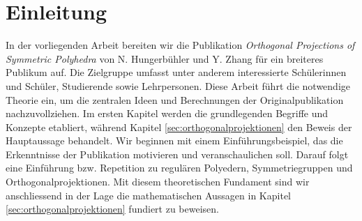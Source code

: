 \section{Einleitung}
In der vorliegenden Arbeit bereiten wir die Publikation \textit{Orthogonal Projections of Symmetric Polyhedra} von N. Hungerbühler und Y. Zhang \cite{hungerbuehler_symmetric_polyhedra} für ein breiteres Publikum auf. Die Zielgruppe umfasst unter anderem interessierte Schülerinnen und Schüler, Studierende sowie Lehrpersonen. Diese Arbeit führt die notwendige Theorie ein, um die zentralen Ideen und Berechnungen der Originalpublikation nachzuvollziehen. Im ersten Kapitel werden die grundlegenden Begriffe und Konzepte etabliert, während Kapitel \ref{sec:orthogonalprojektionen} den Beweis der Hauptaussage behandelt. Wir beginnen mit einem Einführungsbeispiel, das die Erkenntnisse der Publikation motivieren und veranschaulichen soll. Darauf folgt eine Einführung bzw. Repetition zu regulären Polyedern, Symmetriegruppen und Orthogonalprojektionen. Mit diesem theoretischen Fundament sind wir anschliessend in der Lage die mathematischen Aussagen in Kapitel \ref{sec:orthogonalprojektionen} fundiert zu beweisen.


\newpage

\newpage

\newpage


